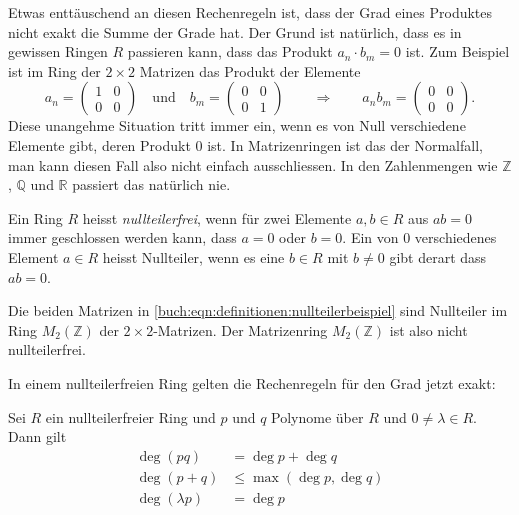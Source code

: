 Etwas enttäuschend an diesen Rechenregeln ist, dass der Grad eines
Produktes nicht exakt die Summe der Grade hat.
Der Grund ist natürlich, dass es in gewissen Ringen $R$ passieren kann,
dass das Produkt $a_n\cdot b_m=0$ ist.
Zum Beispiel ist im Ring der $2\times 2$ Matrizen das Produkt der Elemente
\begin{equation}
a_n = \begin{pmatrix}1&0\\0&0\end{pmatrix}
\quad\text{und}\quad
b_m = \begin{pmatrix}0&0\\0&1\end{pmatrix}
\qquad\Rightarrow\qquad
a_nb_m = \begin{pmatrix}0&0\\0&0\end{pmatrix}.
\label{buch:eqn:definitionen:nullteilerbeispiel}
\end{equation}
Diese unangehme Situation tritt immer ein, wenn es von Null verschiedene
Elemente gibt, deren Produkt $0$ ist.
In Matrizenringen ist das der Normalfall, man kann diesen Fall also nicht
einfach ausschliessen.
In den Zahlenmengen wie $\mathbb{Z}$, $\mathbb{Q}$ und $\mathbb{R}$ passiert
das natürlich nie.

\begin{definition}
Ein Ring $R$ heisst {\em nullteilerfrei}, wenn für zwei Elemente
$a,b\in R$ aus $ab=0$ immer geschlossen werden kann, dass
$a=0$ oder $b=0$.
Ein von $0$ verschiedenes Element $a\in R$ heisst Nullteiler,
wenn es eine $b\in R$ mit $b\ne 0$ gibt derart dass $ab=0$.
\end{definition}

Die beiden Matrizen in
\eqref{buch:eqn:definitionen:nullteilerbeispiel}
sind Nullteiler im Ring $M_2(\mathbb{Z})$ der $2\times 2$-Matrizen.
Der Matrizenring $M_2(\mathbb{Z})$ ist also nicht nullteilerfrei.

In einem nullteilerfreien Ring gelten die Rechenregeln für den Grad
jetzt exakt:

\begin{lemma}
Sei $R$ ein nullteilerfreier Ring und $p$ und $q$ Polynome über $R$
und $0\ne \lambda\in R$.
Dann gilt
\begin{align}
\deg(pq) &= \deg p + \deg q
\label{buch:eqn:polynome:gradsummeexakt}
\\
\deg(p+q) &\le \max(\deg p, \deg q)
\label{buch:eqn:polynome:gradproduktexakt}
\\
\deg(\lambda p) &= \deg p
\label{buch:eqn:polynome:gradskalarexakt}
\end{align}
\end{lemma}

